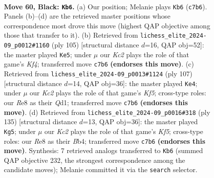\documentclass[11pt]{article}
\begin{document}
\clearpage

\begin{figure}[p]\centering
\begin{subfigure}{0.46\textwidth}\centering
\resizebox{\linewidth}{!}{%
\newchessgame
\chessboard[
  setfen={4r3/2k5/8/6P1/4P2P/2Q5/1K6/8 b - - 6 60},
  showmover=false,
  pgfstyle=straightmove, color=movearrow, markmove={c7-b6}
]}
\caption{}
\end{subfigure}\hfill
\begin{subfigure}{0.46\textwidth}\centering
\resizebox{\linewidth}{!}{%
\newchessgame
\chessboard[
  setfen={5Q2/4K3/8/5k2/p7/P7/8/8 b - - 0 53},
  showmover=false,
  pgfstyle=straightmove, color=movearrow, markmove={f5-e5}
]}
\caption{}
\end{subfigure}
\\[4pt]
\begin{subfigure}{0.46\textwidth}\centering
\resizebox{\linewidth}{!}{%
\newchessgame
\chessboard[
  setfen={8/8/p4QK1/P7/2P2k2/8/8/3q4 b - - 1 54},
  showmover=false,
  pgfstyle=straightmove, color=movearrow, markmove={f4-e4}
]}
\caption{}
\end{subfigure}\hfill
\begin{subfigure}{0.46\textwidth}\centering
\resizebox{\linewidth}{!}{%
\newchessgame
\chessboard[
  setfen={8/5P2/P7/3K4/1b1Q1k2/8/8/8 b - - 2 68},
  showmover=false,
  pgfstyle=straightmove, color=movearrow, markmove={f4-g5}
]}
\caption{}
\end{subfigure}
\caption{\textbf{Move 60, Black: \texttt{Kb6}.} (a) Our position; Melanie plays \texttt{Kb6} (\texttt{c7b6}). Panels (b)--(d) are the retrieved master positions whose correspondence most drove this move (highest QAP objective among those that transfer to it). (b) Retrieved from \texttt{lichess\_elite\_2024-09\_p0012\#1160} (ply 105) [structural distance $d$=16, QAP obj=52]: the master played \texttt{Ke5}; under $\mu$ our \emph{Kc2} plays the role of that game's \emph{Kf4}; transferred move \texttt{c7b6} \textbf{(endorses this move)}. (c) Retrieved from \texttt{lichess\_elite\_2024-09\_p0013\#1124} (ply 107) [structural distance $d$=14, QAP obj=36]: the master played \texttt{Ke4}; under $\mu$ our \emph{Kc2} plays the role of that game's \emph{Kf5}; cross-type roles: our \emph{R}e8 as their \emph{Q}d1; transferred move \texttt{c7b6} \textbf{(endorses this move)}. (d) Retrieved from \texttt{lichess\_elite\_2024-09\_p0016\#318} (ply 135) [structural distance $d$=13, QAP obj=36]: the master played \texttt{Kg5}; under $\mu$ our \emph{Kc2} plays the role of that game's \emph{Kf5}; cross-type roles: our \emph{R}e8 as their \emph{B}b4; transferred move \texttt{c7b6} \textbf{(endorses this move)}. Synthesis: 7 retrieved analogs transferred to \texttt{Kb6} (summed QAP objective 232, the strongest correspondence among the candidate moves); Melanie committed it via the \texttt{search} selector.}
\label{fig:thought-m119}
\end{figure}
\end{document}
